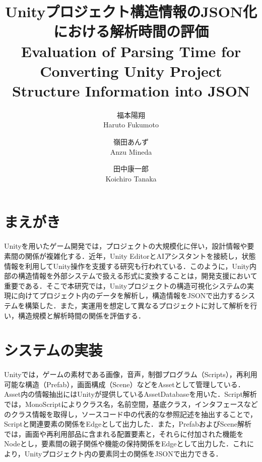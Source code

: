 \documentclass[twocolumn,a4paper,dvipdfmx]{ieicejsp}
\title{{\bf Unityプロジェクト構造情報のJSON化における解析時間の評価}
  {\normalsize \\Evaluation of Parsing Time for Converting Unity Project Structure Information into JSON}}
\author{
    福本陽翔 \\ Haruto Fukumoto\and
    嶺田あんず \\ Anzu Mineda\and
    田中康一郎\\ Koichiro Tanaka\\
  }
\begin{document}
\maketitle
\section{まえがき}
Unityを用いたゲーム開発では，プロジェクトの大規模化に伴い，設計情報や要素間の関係が複雑化する．近年，Unity EditorとAIアシスタントを接続し，状態情報を利用してUnity操作を支援する研究も行われている\cite{mcp_unity}．このように，Unity内部の構造情報を外部システムで扱える形式に変換することは，開発支援において重要である．そこで本研究では，Unityプロジェクトの構造可視化システムの実現に向けてプロジェクト内のデータを解析し，構造情報をJSONで出力するシステムを構築した．また，実運用を想定して異なるプロジェクトに対して解析を行い，構造規模と解析時間の関係を評価する．


\section{システムの実装}
Unityでは，ゲームの素材である画像，音声，制御プログラム（Scripts），再利用可能な構造（Prefab），画面構成（Scene）などをAssetとして管理している．Asset内の情報抽出にはUnityが提供しているAssetDatabaseを用いた．Script解析では，MonoScriptによりクラス名，名前空間，基底クラス，インタフェースなどのクラス情報を取得し，ソースコード中の代表的な参照記述を抽出することで，Scriptと関連要素の関係をEdgeとして出力した．また，PrefabおよびScene解析では，画面や再利用部品に含まれる配置要素と，それらに付加された機能をNodeとし，要素間の親子関係や機能の保持関係をEdgeとして出力した．これにより，Unityプロジェクト内の要素同士の関係をJSONで出力できる．
\end{document}
